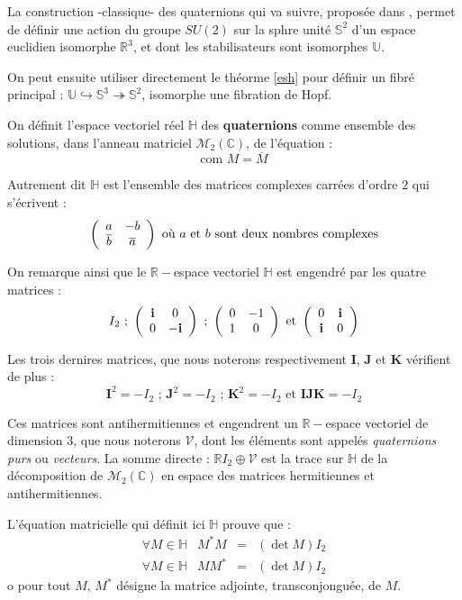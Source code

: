 \par
La construction -classique- des quaternions qui va suivre, propos\'ee dans \cite{dev_par}, %
permet de d\'efinir une action du groupe $SU(2)$ sur la sphre unit\'e $\mathbb{S}^2$ d'un espace euclidien isomorphe  $\mathbb{R}^3$, %
et dont les stabilisateurs sont isomorphes  $\mathbb{U}$.

\par
On peut ensuite utiliser directement le th\'eorme \ref{esh} pour d\'efinir un fibr\'e principal : $\mathbb{U}\hookrightarrow\mathbb{S}^3\twoheadrightarrow\mathbb{S}^2$, %
isomorphe  une fibration de Hopf.

\ligneinter
On d\'efinit l'espace vectoriel r\'eel $\mathbb{H}$ des \textbf{quaternions} comme ensemble des solutions, %
dans l'anneau matriciel $\mathcal{M}_2(\mathbb{C})$, de l'\'equation :
\[\text{com }M=\overline{M}\]

Autrement dit $\mathbb{H}$ est l'ensemble des matrices complexes carr\'ees d'ordre $2$ qui s'\'ecrivent :
\[\left(\begin{array}{cc}a&-b\\ \overline{b}&\overline{a}\end{array}\right)\text{ o\`u $a$ et $b$ sont deux nombres complexes}\]

On remarque ainsi que le $\mathbb{R}-$espace vectoriel $\mathbb{H}$ est engendr\'e par les quatre matrices :
\[I_2\text{ ; }\left(\begin{array}{cc}\mathbf{i}&0\\0&-\mathbf{i}\end{array}\right)\text{ ; }\left(\begin{array}{cc}0&-1\\1&0\end{array}\right)\text{ et }\left(\begin{array}{cc}0&\mathbf{i}\\\mathbf{i}&0\end{array}\right)\]

Les trois dernires matrices, que nous noterons respectivement $\mathbf{I}$, $\mathbf{J}$ et $\mathbf{K}$ v\'erifient de plus :
\[\mathbf{I}^2=-I_2\text{ ; }\mathbf{J}^2=-I_2\text{ ; }\mathbf{K}^2=-I_2\text{ et }\mathbf{IJK}=-I_2\]

Ces matrices sont antihermitiennes et engendrent un $\mathbb{R}-$espace vectoriel de dimension $3$, %
que nous noterons $\mathcal{V}$, dont les \'el\'ements sont appel\'es \emph{quaternions purs} ou \emph{vecteurs}. %
La somme directe : $\mathbb{R}I_2\oplus\mathcal{V}$ est la trace sur $\mathbb{H}$ de la d\'ecomposition de $\mathcal{M}_2(\mathbb{C})$ %
en espace des matrices hermitiennes et antihermitiennes.

\par
L'\'equation matricielle qui d\'efinit ici $\mathbb{H}$ prouve que :
\[
\begin{array}{lccr}
\forall M\in\mathbb{H}& M^{\ast}M&=&(\det M)I_2\\
\forall M\in\mathbb{H}& MM^{\ast}&=&(\det M)I_2
\end{array}
\]
o pour tout $M$, $M^{\ast}$ d\'esigne la matrice adjointe, transconjongu\'ee, de $M$.

